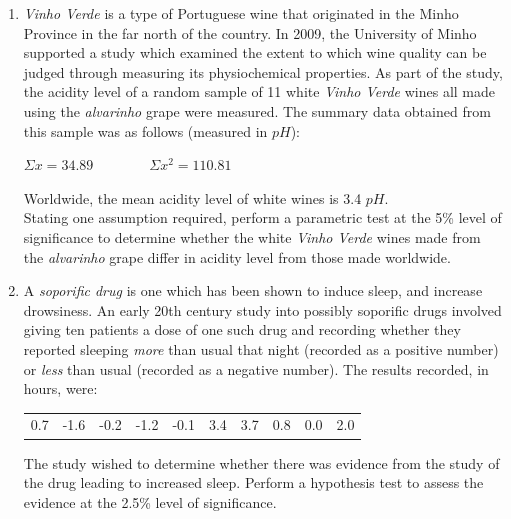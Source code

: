 \documentclass[
  11pt,
]{book}
\begin{document}
\begin{enumerate}
    \item \textit{Vinho Verde} is a type of Portuguese wine that originated in the Minho Province in the far north of the country. In 2009, the University of Minho supported a study which examined the extent to which wine quality can be judged through measuring its physiochemical properties. As part of the study, the acidity level of a random sample of 11 white \textit{Vinho Verde} wines all made using the \textit{alvarinho} grape were measured. The summary data obtained from this sample was as follows (measured in $pH$):
    \begin{center}
    $\Sigma x=\text{34.89} \qquad \qquad \Sigma x^\text{2}=\text{110.81}$
    \end{center}
Worldwide, the mean acidity level of white wines is 3.4 $pH$.\\[1em]
Stating one assumption required, perform a parametric test at the 5\% level of significance to determine whether the white \textit{Vinho Verde} wines made from the \textit{alvarinho} grape differ in acidity level from those made worldwide.
    \item A \textit{soporific drug} is one which has been shown to induce sleep, and increase drowsiness. An early 20th century study into possibly soporific drugs involved giving ten patients a dose of one such drug and recording whether they reported sleeping \textit{more} than usual that night (recorded as a positive number) or \textit{less} than usual (recorded as a negative number). The results recorded, in hours, were:
    \begin{center}
    \begin{tabular}{cccccccccc} 
      0.7 & -1.6 & -0.2 & -1.2 & -0.1 & 3.4 & 3.7 & 0.8 & 0.0 & 2.0\\ 
    \end{tabular}
    \end{center}
    The study wished to determine whether there was evidence from the study of the drug leading to increased sleep. Perform a hypothesis test to assess the evidence at the 2.5\% level of significance.
\end{enumerate}

\pagebreak
\end{document}
